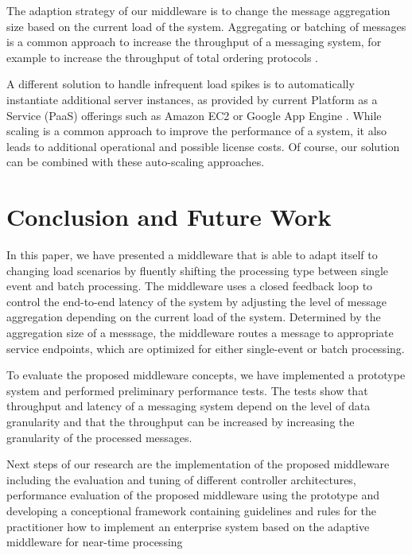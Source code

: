 The adaption strategy of our middleware is to change the message aggregation size based on the current load of the system. Aggregating or batching of messages is a common approach to increase the throughput of a messaging system, for example to increase the throughput of total ordering protocols \citep{Friedman:1997aa} \citep{Friedman:2006aa} \citep{Romano:2012aa} \citep{Didona:2012aa}.

A different solution to handle infrequent load spikes is to automatically instantiate additional server instances, as provided by current Platform as a Service (PaaS) offerings such as Amazon EC2 \citep{ec2_autoscaling} or Google App Engine \citep{google_cloud_autoscaling}. While scaling is a common approach to improve the performance of a system, it also leads to additional operational and possible license costs. Of course, our solution can be combined with these auto-scaling approaches.

\section{Conclusion and Future Work}\label{sec:conclusion}
In this paper, we have presented a middleware that is able to adapt itself to changing load scenarios by fluently shifting the processing type between single event and batch processing. The middleware uses a closed feedback loop to control the end-to-end latency of the system by adjusting the level of message aggregation depending on the current load of the system. Determined by the aggregation size of a messsage, the middleware routes a message to appropriate service endpoints, which are optimized for either single-event or batch processing.

To evaluate the proposed middleware concepts, we have implemented a prototype system and performed preliminary performance tests. The tests show that throughput and latency of a messaging system depend on the level of data granularity and that the throughput can be increased by increasing the granularity of the processed messages.

Next steps of our research are the implementation of the proposed middleware including the evaluation and tuning of different controller architectures, performance evaluation of the proposed middleware using the prototype and developing a conceptional framework containing guidelines and rules for the practitioner how to implement an enterprise system based on the adaptive middleware for near-time processing
